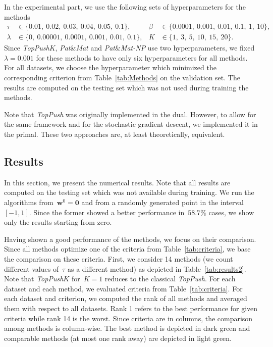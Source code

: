 \documentclass[11pt,a4paper]{article}
\theoremstyle{definition}
\newcommand{\toppush}{\textit{TopPush}\xspace}
\newcommand{\toppushk}{\textit{TopPush$K$}\xspace}
\newcommand{\patmat}{\textit{Pat}\textup{\&}\textit{Mat}\xspace}
\newcommand{\patmatnp}{\textit{Pat}\textup{\&}\textit{Mat-NP}\xspace}
\begin{document}
In the experimental part, we use the following sets of hyperparameters for the methods
\begin{equation*}
  \begin{aligned}
    \tau    & \in \{0.01,\ 0.02,\ 0.03,\ 0.04,\ 0.05,\ 0.1 \}, &
    \beta   & \in \{0.0001,\ 0.001,\ 0.01,\ 0.1,\ 1,\ 10 \}, \\
    \lambda & \in \{0,\ 0.00001,\ 0.0001,\ 0.001,\ 0.01,\ 0.1 \}, &
    K       & \in \{1,\ 3,\ 5,\ 10,\ 15,\ 20 \}.
  \end{aligned}
\end{equation*}
Since \toppushk, \patmat and \patmatnp use two hyperparameters, we fixed~$\lambda=0.001$ for these methods to have only six hyperparameters for all methods. For all datasets, we choose the  hyperparameter which minimized the corresponding criterion from Table~\ref{tab:Methods} on the validation set. The results are computed on the testing set which was not used during training the methods.

Note that \toppush was originally implemented in the dual. However, to allow for the same framework and for the stochastic gradient descent, we implemented it in the primal. These two approaches are, at least theoretically, equivalent. 


\subsection{Results}

In this section, we present the numerical results. Note that all results are computed on the testing set which was not available during training. We run the algorithms from~$\bm{w}^0=\bm{0}$ and from a randomly generated point in the interval~$[-1,1].$ Since the former showed a better performance in~$58.7\%$ cases, we show only the results starting from zero.

Having shown a good performance of the methods, we focus on their comparison. Since all methods optimize one of the criteria from Table~\ref{tab:criteria}, we base the comparison on these criteria. First, we consider 14 methods (we count different values of~$\tau$ as a different method) as depicted in Table~\ref{tab:results2}. Note that \toppushk for~$K=1$ reduces to the classical \toppush. For each dataset and each method, we evaluated criteria from Table~\ref{tab:criteria}. For each dataset and criterion, we computed the rank of all methods and averaged them with respect to all datasets. Rank 1 refers to the best performance for given criteria while rank 14 is the worst. Since criteria are in columns, the comparison among methods is column-wise. The best method is depicted in dark green and comparable methods (at most one rank away) are depicted in light green.
\end{document}
